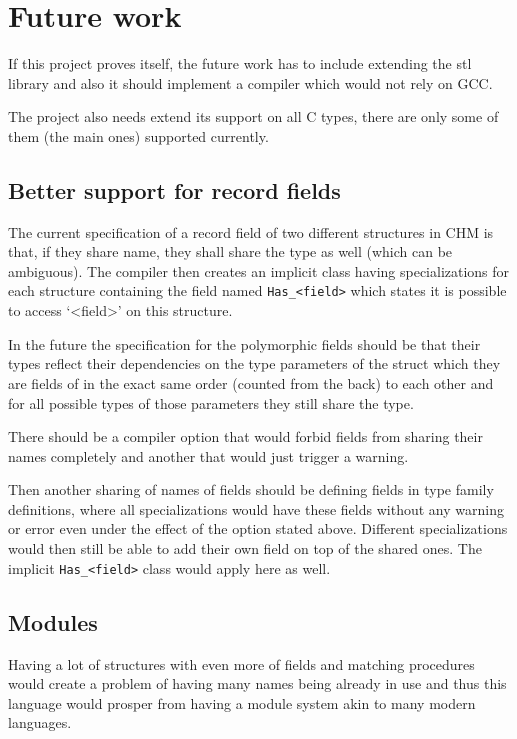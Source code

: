 \section{Future work}

If this project proves itself, the future work has to include extending the stl library and also it should implement a compiler which would not rely on GCC.

The project also needs extend its support on all C types, there are only some of them (the main ones) supported currently.

\subsection{Better support for record fields}

The current specification of a record field of two different structures in CHM is that, if they share name, they shall share the type as well (which can be ambiguous). The compiler then creates an implicit class having specializations for each structure containing the field named \lstinline{Has_<field>} which states it is possible to access `<field>' on this structure.

In the future the specification for the polymorphic fields should be that their types reflect their dependencies on the type parameters of the struct which they are fields of in the exact same order (counted from the back) to each other and for all possible types of those parameters they still share the type.

There should be a compiler option that would forbid fields from sharing their names completely and another that would just trigger a warning.

Then another sharing of names of fields should be defining fields in type family definitions, where all specializations would have these fields without any warning or error even under the effect of the option stated above. Different specializations would then still be able to add their own field on top of the shared ones. The implicit \lstinline{Has_<field>} class would apply here as well.

\subsection{Modules}

Having a lot of structures with even more of fields and matching procedures would create a problem of having many names being already in use and thus this language would prosper from having a module system akin to many modern languages.

